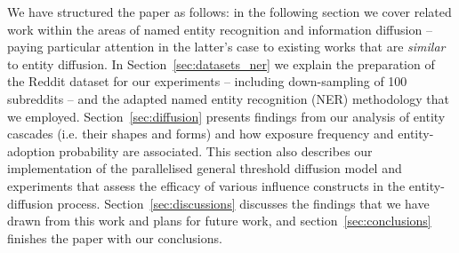 \documentclass[sigconf,anonymous,review]{acmart}
\begin{document}
We have structured the paper as follows: in the following section we cover related work within the areas of named entity recognition and information diffusion -- paying particular attention in the latter's case to existing works that are \emph{similar} to entity diffusion.
In Section~\ref{sec:datasets_ner} we explain the preparation of the Reddit dataset for our experiments -- including down-sampling of 100 subreddits -- and the adapted named entity recognition (NER) methodology that we employed.
Section~\ref{sec:diffusion} presents findings from our analysis of entity cascades (i.e. their shapes and forms) and how exposure frequency and entity-adoption probability are associated.
This section also describes our implementation of the parallelised general threshold diffusion model and experiments that assess the efficacy of various influence constructs in the entity-diffusion process.
Section~\ref{sec:discussions} discusses the findings that we have drawn from this work and plans for future work, and section~\ref{sec:conclusions} finishes the paper with our conclusions.


%
%
%
%
\end{document}
